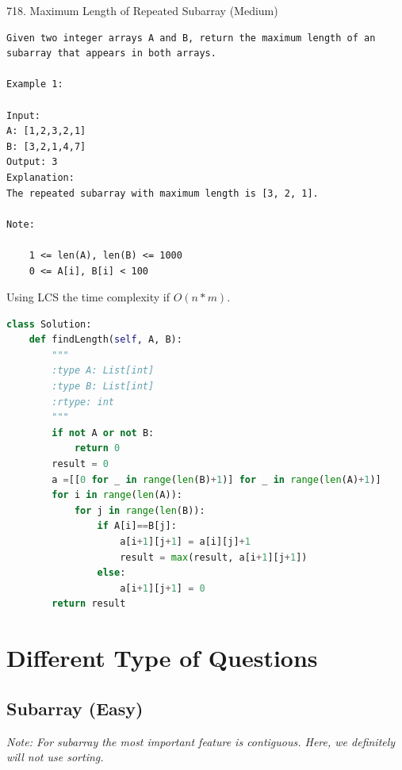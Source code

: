 \documentclass[../specific-algorithms.tex]{subfiles}
\begin{document}
718. Maximum Length of Repeated Subarray (Medium)
\begin{lstlisting}
Given two integer arrays A and B, return the maximum length of an subarray that appears in both arrays.

Example 1:

Input:
A: [1,2,3,2,1]
B: [3,2,1,4,7]
Output: 3
Explanation: 
The repeated subarray with maximum length is [3, 2, 1].

Note:

    1 <= len(A), len(B) <= 1000
    0 <= A[i], B[i] < 100
\end{lstlisting}
Using LCS the time complexity if $O(n*m)$.
\begin{lstlisting}[language = Python]
class Solution:
    def findLength(self, A, B):
        """
        :type A: List[int]
        :type B: List[int]
        :rtype: int
        """
        if not A or not B:
            return 0
        result = 0
        a =[[0 for _ in range(len(B)+1)] for _ in range(len(A)+1)]
        for i in range(len(A)):
            for j in range(len(B)):
                if A[i]==B[j]:
                    a[i+1][j+1] = a[i][j]+1
                    result = max(result, a[i+1][j+1])
                else:
                    a[i+1][j+1] = 0
        return result
\end{lstlisting}



\section{Different Type of Questions}
\subsection{Subarray (Easy) }
\textit{Note: For subarray the most important feature is contiguous. Here, we definitely will not use sorting.}
\end{document}
